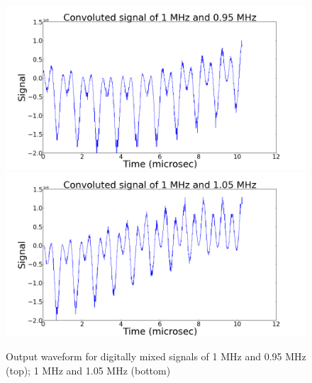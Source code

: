 \documentclass[11pt]{article}
\begin{document}
\begin{figure}
\centering
\includegraphics[scale=0.35]{pictures/digitaloninefivewave}
\includegraphics[scale=0.35]{pictures/digitaloneofivewave}
\caption{Output waveform for digitally mixed signals of 1 MHz and 0.95 MHz (top); 1 MHz and 1.05 MHz (bottom) \label{dwave}}
\end{figure}
\end{document}
